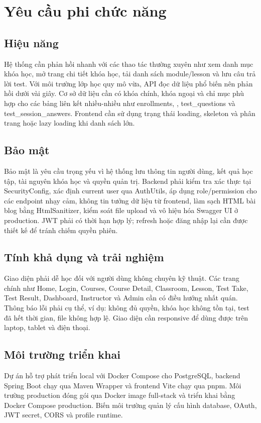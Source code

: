 \documentclass[12pt,a4paper]{report}
\begin{document}
\section{Yêu cầu phi chức năng}
\subsection{Hiệu năng}
Hệ thống cần phản hồi nhanh với các thao tác thường xuyên như xem danh mục khóa học, mở trang chi tiết khóa học, tải danh sách module/lesson và lưu câu trả lời test. Với môi trường lớp học quy mô vừa, API đọc dữ liệu phổ biến nên phản hồi dưới vài giây. Cơ sở dữ liệu cần có khóa chính, khóa ngoại và chỉ mục phù hợp cho các bảng liên kết nhiều-nhiều như enrollments, , test\_questions và test\_session\_answers. Frontend cần sử dụng trạng thái loading, skeleton và phân trang hoặc lazy loading khi danh sách lớn.

\subsection{Bảo mật}
Bảo mật là yêu cầu trọng yếu vì hệ thống lưu thông tin người dùng, kết quả học tập, tài nguyên khóa học và quyền quản trị. Backend phải kiểm tra xác thực tại SecurityConfig, xác định current user qua AuthUtils, áp dụng role/permission cho các endpoint nhạy cảm, không tin tưởng dữ liệu từ frontend, làm sạch HTML bài blog bằng HtmlSanitizer, kiểm soát file upload và vô hiệu hóa Swagger UI ở production. JWT phải có thời hạn hợp lý; refresh hoặc đăng nhập lại cần được thiết kế để tránh chiếm quyền phiên.

\subsection{Tính khả dụng và trải nghiệm}
Giao diện phải dễ học đối với người dùng không chuyên kỹ thuật. Các trang chính như Home, Login, Courses, Course Detail, Classroom, Lesson, Test Take, Test Result, Dashboard, Instructor và Admin cần có điều hướng nhất quán. Thông báo lỗi phải cụ thể, ví dụ: không đủ quyền, khóa học không tồn tại, test đã hết thời gian, file không hợp lệ. Giao diện cần responsive để dùng được trên laptop, tablet và điện thoại.

\subsection{Môi trường triển khai}
Dự án hỗ trợ phát triển local với Docker Compose cho PostgreSQL, backend Spring Boot chạy qua Maven Wrapper và frontend Vite chạy qua pnpm. Môi trường production đóng gói qua Docker image full-stack và triển khai bằng Docker Compose production. Biến môi trường quản lý cấu hình database, OAuth, JWT secret, CORS và profile runtime.
\end{document}
